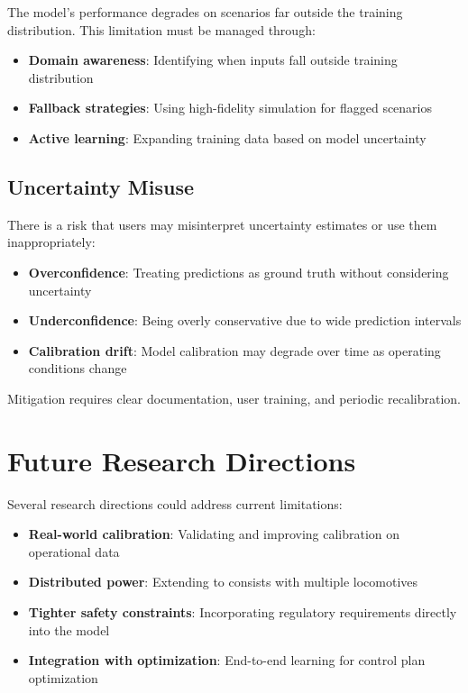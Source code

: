 The model's performance degrades on scenarios far outside the training distribution. This limitation must be managed through:
\begin{itemize}
    \item \textbf{Domain awareness}: Identifying when inputs fall outside training distribution
    \item \textbf{Fallback strategies}: Using high-fidelity simulation for flagged scenarios
    \item \textbf{Active learning}: Expanding training data based on model uncertainty
\end{itemize}


\subsection{Uncertainty Misuse}

There is a risk that users may misinterpret uncertainty estimates or use them inappropriately:
\begin{itemize}
    \item \textbf{Overconfidence}: Treating predictions as ground truth without considering uncertainty
    \item \textbf{Underconfidence}: Being overly conservative due to wide prediction intervals
    \item \textbf{Calibration drift}: Model calibration may degrade over time as operating conditions change
\end{itemize}

Mitigation requires clear documentation, user training, and periodic recalibration.


\section{Future Research Directions}

Several research directions could address current limitations:
\begin{itemize}
    \item \textbf{Real-world calibration}: Validating and improving calibration on operational data
    \item \textbf{Distributed power}: Extending to consists with multiple locomotives
    \item \textbf{Tighter safety constraints}: Incorporating regulatory requirements directly into the model
    \item \textbf{Integration with optimization}: End-to-end learning for control plan optimization
\end{itemize}


